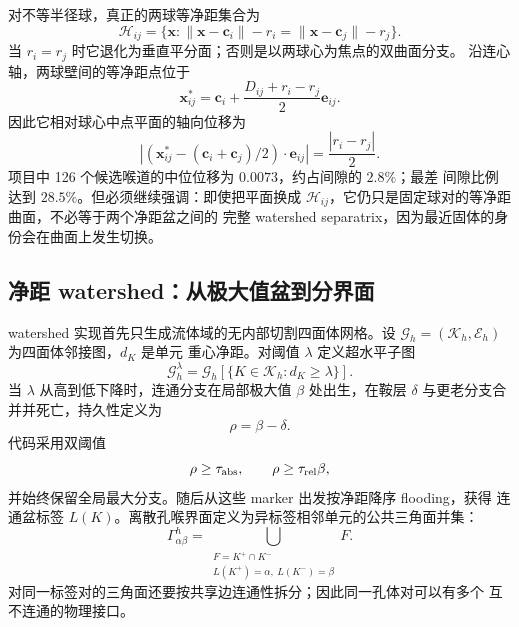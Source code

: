 \documentclass[UTF8,zihao=-4]{ctexart}
\begin{document}
对不等半径球，真正的两球等净距集合为
\begin{equation}\label{eq:pair-clearance}
  \mathcal H_{ij}=\{\bm x:
  \|\bm x-\bm c_i\|-r_i
  =\|\bm x-\bm c_j\|-r_j\}.
\end{equation}
当 $r_i=r_j$ 时它退化为垂直平分面；否则是以两球心为焦点的双曲面分支。
沿连心轴，两球壁间的等净距点位于
\begin{equation}\label{eq:saddle-shift}
  \bm x_{ij}^*=\bm c_i+\frac{D_{ij}+r_i-r_j}{2}\bm e_{ij}.
\end{equation}
因此它相对球心中点平面的轴向位移为
\begin{equation}
  \left|(\bm x_{ij}^*-(\bm c_i+\bm c_j)/2)\cdot\bm e_{ij}\right|
  =\frac{|r_i-r_j|}{2}.
\end{equation}
项目中 126 个候选喉道的中位位移为 $0.0073$，约占间隙的 $2.8\%$；最差
间隙比例达到 $28.5\%$。但必须继续强调：即使把平面换成
$\mathcal H_{ij}$，它仍只是固定球对的等净距曲面，不必等于两个净距盆之间的
完整 watershed separatrix，因为最近固体的身份会在曲面上发生切换。

\subsection{净距 watershed：从极大值盆到分界面}

watershed 实现首先只生成流体域的无内部切割四面体网格。设
$\mathcal G_h=(\mathcal K_h,\mathcal E_h)$ 为四面体邻接图，$d_K$ 是单元
重心净距。对阈值 $\lambda$ 定义超水平子图
\begin{equation}
  \mathcal G_h^\lambda
  =\mathcal G_h[\{K\in\mathcal K_h:d_K\ge\lambda\}].
\end{equation}
当 $\lambda$ 从高到低下降时，连通分支在局部极大值 $\beta$ 处出生，在鞍层
$\delta$ 与更老分支合并并死亡，持久性定义为
\begin{equation}
  \rho=\beta-\delta.
\end{equation}
代码采用双阈值
\begin{equation}\label{eq:persistence-threshold}
  \rho\ge\tau_{\rm abs},\qquad
  \rho\ge\tau_{\rm rel}\beta,
\end{equation}
并始终保留全局最大分支。随后从这些 marker 出发按净距降序 flooding，获得
连通盆标签 $L(K)$。离散孔喉界面定义为异标签相邻单元的公共三角面并集：
\begin{equation}\label{eq:watershed-interface}
  \Gamma_{\alpha\beta}^h
  =\bigcup_{\substack{F=K^+\cap K^-\\
  L(K^+)=\alpha,\ L(K^-)=\beta}}
  F.
\end{equation}
对同一标签对的三角面还要按共享边连通性拆分；因此同一孔体对可以有多个
互不连通的物理接口。
\end{document}
